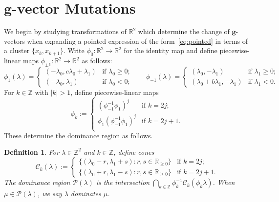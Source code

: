 \documentclass{amsart}
\newtheorem{definition}[theorem]{Definition}
\numberwithin{theorem}{section}
\newcommand{\bfg}{\boldsymbol{g}}
\newcommand{\cC}{\mathcal{C}}
\newcommand{\cP}{\mathcal{P}}
\newcommand{\RR}{\mathbb{R}}
\newcommand{\ZZ}{\mathbb{Z}}
\begin{document}
\section{$\bfg$-vector Mutations}
  We begin by studying transformations of $\RR^2$ which determine the change of $\bfg$-vectors when expanding a pointed expression of the form~\eqref{eq:pointed} in terms of a cluster $\{x_k,x_{k+1}\}$.
  Write $\phi_0:\RR^2\to\RR^2$ for the identity map and define piecewise-linear maps $\phi_{\pm 1}:\RR^2\to\RR^2$ as follows:
  \begin{equation}
    \phi_1(\lambda)
    =
    \begin{cases} 
      (-\lambda_0,c\lambda_0+\lambda_1) & \text{if $\lambda_0 \ge 0$;}\\
      (-\lambda_0,\lambda_1) & \text{if $\lambda_0 < 0$;}
    \end{cases}
    \qquad
    \phi_{-1}(\lambda)
    =
    \begin{cases} 
      (\lambda_0,-\lambda_1) & \text{if $\lambda_1 \ge 0$;}\\
      (\lambda_0+b\lambda_1,-\lambda_1) & \text{if $\lambda_1 < 0$.}
    \end{cases}
  \end{equation}
  For $k\in\ZZ$ with $|k|>1$, define piecewise-linear maps
  \[\phi_k
    :=
    \begin{cases}
      (\phi_{-1}^{-1}\phi_1)^j & \text{if $k=2j$;}\\
      \phi_1(\phi_{-1}^{-1}\phi_1)^j & \text{if $k=2j+1$.}\\
    \end{cases}
  \]
  These determine the dominance region as follows.
  \begin{definition}
    For $\lambda\in\ZZ^2$ and $k\in\ZZ$, define cones 
    \[\cC_k(\lambda)
      :=
      \begin{cases}
        \{(\lambda_0-r,\lambda_1+s):r,s\in\RR_{\ge0}\} & \text{if $k=2j$;}\\
        \{(\lambda_0+r,\lambda_1-s):r,s\in\RR_{\ge0}\} & \text{if $k=2j+1$.}
      \end{cases}
    \]
    The \emph{dominance region} $\cP(\lambda)$ is the intersection  $\bigcap_{k\in\ZZ}\phi_k^{-1}\cC_k(\phi_k\lambda)$.
    When $\mu\in\cP(\lambda)$, we say \emph{$\lambda$ dominates $\mu$}.
  \end{definition}
\end{document}
